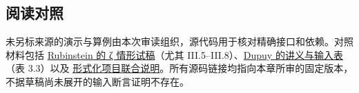 \subsection*{阅读对照}
未另标来源的演示与算例由本次审读组织，源代码用于核对精确接口和依赖。对照材料包括 \href{https://www.math.uwaterloo.ca/~mrubinst/alpoge_claude_grh/zeta-paper.pdf}{Rubinstein 的 ζ 情形试稿}（尤其 III.5--III.8）、\href{https://tdupu.github.io/riemann-public/riemann-book.pdf}{Dupuy 的讲义与输入表}（表 3.3）以及 \href{https://leanprover-community.github.io/blog/posts/riemann-hypothesis/}{形式化项目联合说明}。所有源码链接均指向本章所审的固定版本，不据草稿尚未展开的输入断言证明不存在。
